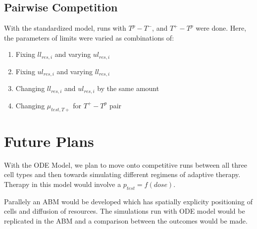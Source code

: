 \documentclass[11pt,a4paper]{article}
\begin{document}
\subsection{Pairwise Competition}
With the standardized model, runs with $T^p - T^-$, and $T^+ - T^p$ were done. Here, the parameters of limits were varied as combinations of:
\begin{enumerate}
  \item Fixing $ll_{res,i}$ and varying $ul_{res,i}$
  \item Fixing $ul_{res,i}$ and varying $ll_{res,i}$
  \item Changing $ll_{res,i}$ and $ul_{res,i}$ by the same amount
  \item Changing $\mu_{test,T+}$ for $T^+ - T^p$ pair
\end{enumerate}

\section{Future Plans}
With the ODE Model, we plan to move onto competitive runs between all three cell types and then towards simulating different regimens of adaptive therapy. Therapy in this model would involve a $p_{test} = f(dose)$.

Parallely an ABM would be developed which has spatially explicity positioning of cells and diffusion of resources. The simulations run with ODE model would be replicated in the ABM and a comparison between the outcomes would be made.

\printbibliography
\end{document}
